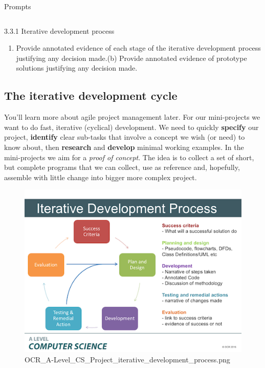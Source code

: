 \documentclass[11pt]{article}
\makeatletter
\def\maxwidth{\ifdim\Gin@nat@width>\linewidth\linewidth
    \else\Gin@nat@width\fi}
\let\Oldincludegraphics\includegraphics
\renewcommand{\includegraphics}[1]{\Oldincludegraphics[width=.8\maxwidth]{#1}}
\providecommand{\tightlist}{%
      \setlength{\itemsep}{0pt}\setlength{\parskip}{0pt}}
\makeatother
\begin{document}
\textbar{}

Prompts

\begin{longtable}[]{@{}lc@{}}
\toprule
\bottomrule
\end{longtable}

\textbar{}

3.3.1 Iterative development process

\textbar{}

\begin{enumerate}
\def\labelenumi{(\alph{enumi})}
\tightlist
\item
  Provide annotated evidence of each stage of the iterative development
  process justifying any decision made.(b) Provide annotated evidence of
  prototype solutions justifying any decision made.
\end{enumerate}

    \subsection{The iterative development
cycle}\label{the-iterative-development-cycle}

    You'll learn more about agile project management later. For our
mini-projects we want to do fast, iterative (cyclical) development. We
need to quickly \textbf{specify} our project, \textbf{identify} clear
sub-tasks that involve a concept we wish (or need) to know about, then
\textbf{research} and \textbf{develop} minimal working examples. In the
mini-projects we aim for a \emph{proof of concept}. The idea is to
collect a set of short, but complete programs that we can collect, use
as reference and, hopefully, assemble with little change into bigger
more complex project.

    \begin{figure}
\centering
\includegraphics{OCR_A-Level_CS_Project_iterative_development_process.png}
\caption{OCR\_A-Level\_CS\_Project\_iterative\_development\_process.png}
\end{figure}
\end{document}
